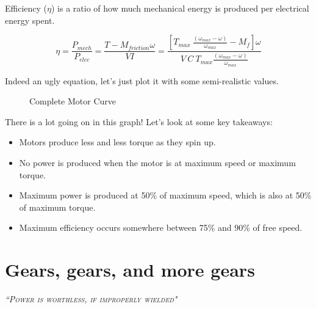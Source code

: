 \documentclass[10pt,letterpaper]{book}
\begin{document}
Efficiency ($\eta$) is a ratio of how much mechanical energy is produced per electrical energy spent.

\begin{equation} \label{eq:motor_efficiency_curve}
  \eta = \frac{P_{mech}}{P_{elec}} = \frac{T-M_{friction} \omega}{V I}
  = \frac{[T_{max} \ \frac{(\omega_{max}-\omega)}{\omega_{max}} - M_f] \omega}{V\ C\ T_{max} \frac{(\omega_{max}-\omega)}{\omega_{max}}} \nonumber
\end{equation}

Indeed an ugly equation, let's just plot it with some semi-realistic values.

\begin{figure}[H] \centering
{}
\caption{Complete Motor Curve}
\end{figure}

There is a lot going on in this graph! Let's look at some key takeaways:
\begin{itemize}
	\item Motors produce less and less torque as they spin up.
	\item No power is produced when the motor is at maximum speed or maximum torque.
	\item Maximum power is produced at 50\% of maximum speed, which is also at 50\% of maximum torque.
	\item Maximum efficiency occurs somewhere between 75\% and 90\% of free speed.
\end{itemize}

\chapter{Gears, gears, and more gears}
 {\slshape \scshape ``Power is worthless, if improperly wielded"}
 \\
\end{document}
